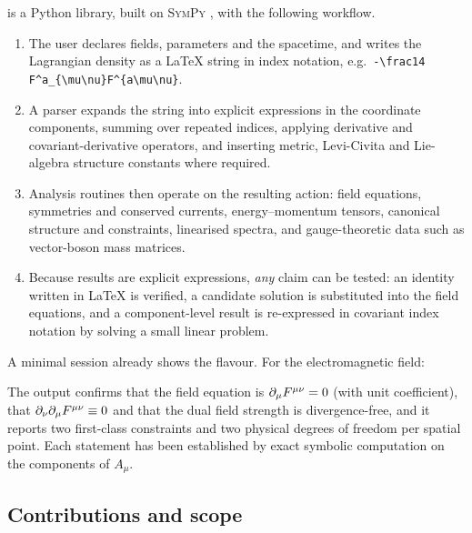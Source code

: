\fs{} is a Python library, built on \textsc{SymPy} \cite{Meurer2017}, with the following workflow.
\begin{enumerate}[nosep]
\item The user declares fields, parameters and the spacetime, and writes the Lagrangian density as a \LaTeX{} string in index notation, e.g.\ \verb|-\frac14 F^a_{\mu\nu}F^{a\mu\nu}|.
\item A parser expands the string into explicit expressions in the coordinate components, summing over repeated indices, applying derivative and covariant-derivative operators, and inserting metric, Levi-Civita and Lie-algebra structure constants where required.
\item Analysis routines then operate on the resulting action: field equations, symmetries and conserved currents, energy--momentum tensors, canonical structure and constraints, linearised spectra, and gauge-theoretic data such as vector-boson mass matrices.
\item Because results are explicit expressions, \emph{any} claim can be tested: an identity written in \LaTeX{} is verified, a candidate solution is substituted into the field equations, and a component-level result is re-expressed in covariant index notation by solving a small linear problem.
\end{enumerate}
A minimal session already shows the flavour. For the electromagnetic field:

The output confirms that the field equation is $\partial_\mu F^{\mu\nu}=0$ (with unit coefficient), that $\partial_\nu\partial_\mu F^{\mu\nu}\equiv 0$ and that the dual field strength is divergence-free, and it reports two first-class constraints and two physical degrees of freedom per spatial point. Each statement has been established by exact symbolic computation on the components of $A_\mu$.

\subsection{Contributions and scope}

